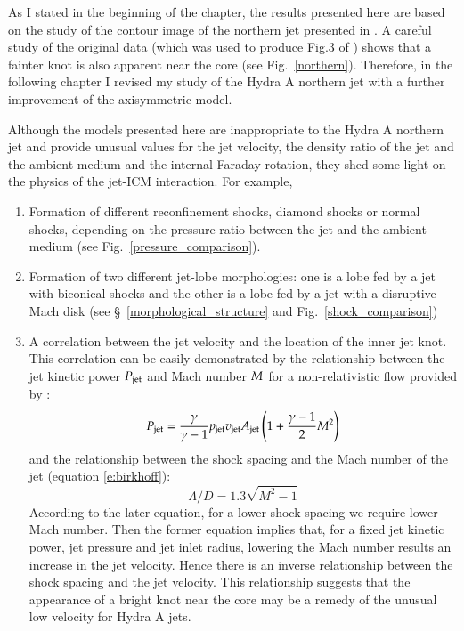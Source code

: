 As I stated in the beginning of the chapter, the results presented here are based on the study of the contour image of the northern jet presented in \citep{taylor90}. A careful study of the original data (which was used to produce Fig.3 of \citet{taylor90}) shows that a fainter knot is also apparent near the core (see Fig.~\ref{northern}). Therefore, in the following chapter I revised my study of the Hydra A northern jet with a further improvement of the axisymmetric model. 

Although the models presented here are inappropriate to the Hydra A northern jet and provide unusual values for the jet velocity, the density ratio of the jet and the ambient medium and the internal Faraday rotation, they shed some light on the physics of the jet-ICM interaction. For example, 

\begin{enumerate}
\item Formation of different reconfinement shocks, diamond shocks or normal shocks, depending on the pressure ratio between the jet and the ambient medium (see Fig.~\ref{pressure_comparison}). 
\item Formation of two different jet-lobe morphologies: one is a lobe fed by a jet with biconical shocks and the other is a lobe fed by a jet with a disruptive Mach disk (see \S~\ref{morphological_structure} and Fig.~\ref{shock_comparison})
\item A correlation between the jet velocity and the location of the inner jet knot. This correlation can be easily demonstrated by the relationship between the jet kinetic power $P_{\rm jet}$ and Mach number $M_{\rm}$ for a non-relativistic flow provided by \citet{sutherland07}:
\begin{equation}
P_{\rm jet} = \frac{\gamma}{\gamma - 1} p_{\rm jet} v_{\rm jet}A_{\rm jet} \left ( 1 + \frac{\gamma -1 }{2} M_{\rm}^2 \right )
\label{e:nrP}
\end{equation}
and the relationship between the shock spacing and the Mach number of the jet (equation \ref{e:birkhoff}):
\begin{equation}
\Lambda/D = 1.3\sqrt{M^2 - 1} \nonumber
\end{equation}
According to the later equation, for a lower shock spacing we require lower Mach number. Then the former equation implies that, for a fixed jet kinetic power, jet pressure and jet inlet radius, lowering the Mach number results an increase in the jet velocity. Hence there is an inverse relationship between the shock spacing and the jet velocity. This relationship suggests that the appearance of a bright knot near the core may be a remedy of the unusual low velocity for Hydra A jets. 


\end{enumerate}
